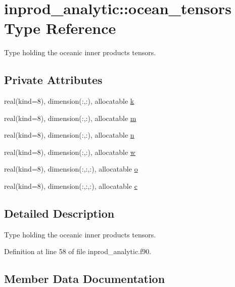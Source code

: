 \hypertarget{structinprod__analytic_1_1ocean__tensors}{}\section{inprod\+\_\+analytic\+:\+:ocean\+\_\+tensors Type Reference}
\label{structinprod__analytic_1_1ocean__tensors}


Type holding the oceanic inner products tensors.  


\subsection*{Private Attributes}
\begin{DoxyCompactItemize}
\item 
real(kind=8), dimension(\+:,\+:), allocatable \hyperlink{structinprod__analytic_1_1ocean__tensors_a1ab0d8f229b274e954a53cc1ce40cac1}{k}
\item 
real(kind=8), dimension(\+:,\+:), allocatable \hyperlink{structinprod__analytic_1_1ocean__tensors_a6f8f8b2b4ef239db0a9f751d7e8452e8}{m}
\item 
real(kind=8), dimension(\+:,\+:), allocatable \hyperlink{structinprod__analytic_1_1ocean__tensors_a5087e225a596aee2d668f6282dd6a019}{n}
\item 
real(kind=8), dimension(\+:,\+:), allocatable \hyperlink{structinprod__analytic_1_1ocean__tensors_ae4875d9d3ea854b3b7b57e0c07a07ede}{w}
\item 
real(kind=8), dimension(\+:,\+:,\+:), allocatable \hyperlink{structinprod__analytic_1_1ocean__tensors_abab4899297820e7a92cc8d363a91ed13}{o}
\item 
real(kind=8), dimension(\+:,\+:,\+:), allocatable \hyperlink{structinprod__analytic_1_1ocean__tensors_a146670849488f50eff7b1937077a67ff}{c}
\end{DoxyCompactItemize}


\subsection{Detailed Description}
Type holding the oceanic inner products tensors. 

Definition at line 58 of file inprod\+\_\+analytic.\+f90.



\subsection{Member Data Documentation}
